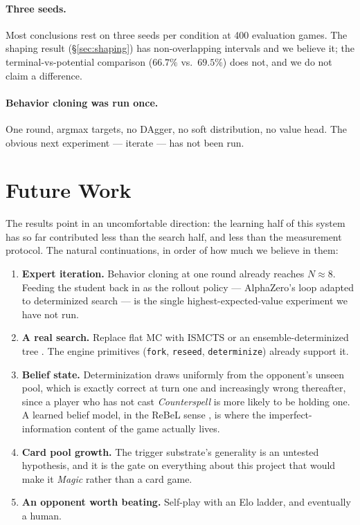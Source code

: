 \documentclass[11pt]{article}
\begin{document}
\paragraph{Three seeds.} Most conclusions rest on three seeds per condition at 400 evaluation games. The shaping result (\S\ref{sec:shaping}) has non-overlapping intervals and we believe it; the terminal-vs-potential comparison ($66.7\%$ vs.\ $69.5\%$) does not, and we do not claim a difference.

\paragraph{Behavior cloning was run once.} One round, argmax targets, no DAgger, no soft distribution, no value head. The obvious next experiment --- iterate --- has not been run.

\section{Future Work}

The results point in an uncomfortable direction: the learning half of this system has so far contributed less than the search half, and less than the measurement protocol. The natural continuations, in order of how much we believe in them:

\begin{enumerate}\itemsep2pt
\item \textbf{Expert iteration.} Behavior cloning at one round already reaches $N\approx8$. Feeding the student back in as the rollout policy --- AlphaZero's loop \citep{silver2018alphazero,anthony2017exit} adapted to determinized search --- is the single highest-expected-value experiment we have not run.
\item \textbf{A real search.} Replace flat MC with ISMCTS \citep{cowling2012ismcts} or an ensemble-determinized tree \citep{cowling2012magic}. The engine primitives (\texttt{fork}, \texttt{reseed}, \texttt{determinize}) already support it.
\item \textbf{Belief state.} Determinization draws uniformly from the opponent's unseen pool, which is exactly correct at turn one and increasingly wrong thereafter, since a player who has not cast \textit{Counterspell} is more likely to be holding one. A learned belief model, in the ReBeL sense \citep{brown2020rebel}, is where the imperfect-information content of the game actually lives.
\item \textbf{Card pool growth.} The trigger substrate's generality is an untested hypothesis, and it is the gate on everything about this project that would make it \textit{Magic} rather than a card game.
\item \textbf{An opponent worth beating.} Self-play with an Elo ladder, and eventually a human.
\end{enumerate}
\end{document}
